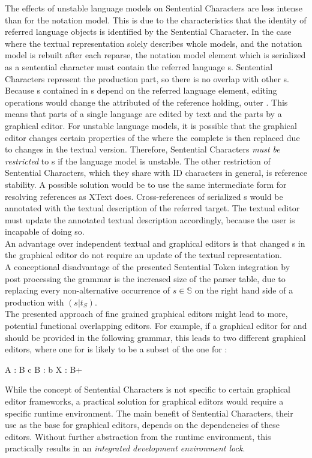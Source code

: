The effects of unstable language models on Sentential Characters are less intense than for the notation model. This is due to the characteristics that the identity of referred language objects is identified by the Sentential Character. In the case where the textual representation solely describes whole models, and the notation model is rebuilt after each reparse, the notation model element which is serialized as a sentential character must contain the referred language s. Sentential Characters represent the production part, so there is no overlap with other s. Because s contained in s depend on the referred language element, editing operations would change the attributed  of the reference holding, outer . This means that parts of a single language  are edited by text and the parts by a graphical editor. For unstable language models, it is possible that the graphical editor changes certain properties of the  where the complete  is then replaced due to changes in the textual version. Therefore, Sentential Characters \emph{must be restricted }to s if the language model is unstable. The other restriction of Sentential Characters, which they share with ID characters in general, is reference stability. A possible solution would be to use the same intermediate form for resolving references as XText does. Cross-references of serialized s would be annotated with the textual description of the referred target. The textual editor must update the annotated textual description accordingly, because the user is incapable of doing so. \\
An advantage over independent textual and graphical editors is that changed s in the graphical editor do not require an update of the textual representation.\\
A conceptional disadvantage of the presented Sentential Token integration by post processing the grammar is the increased size of the parser table, due to replacing every non-alternative occurrence of $s \in \mathbb{S}$ on the right hand side of a production with $(s | t_S)$. \\
The presented approach of fine grained graphical editors might lead to more, potential functional overlapping editors. For example, if a graphical editor for  and  should be provided in the following grammar, this leads to two different graphical editors, where one for  is likely to be a subset of the one for :
\begin{xtxt}
A : B c
B : b
X : B+
\end{xtxt}
While the concept of Sentential Characters is not specific to certain graphical editor frameworks, a practical solution for graphical editors would require a specific runtime environment. The main benefit of Sentential Characters, their use as the base for graphical editors, depends on the dependencies of these editors. Without further abstraction from the runtime environment, this practically results in an \emph{integrated development environment lock}.